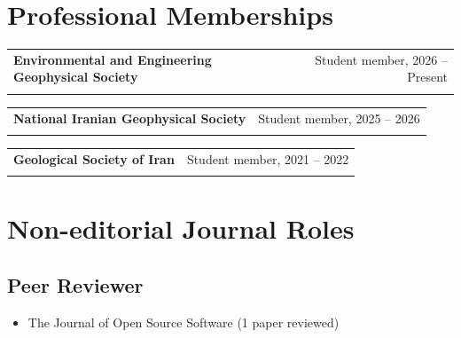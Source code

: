 \documentclass[letterpaper,10pt]{article}
\makeatletter
\newcommand{\ressubheading}[4]{%
	\begin{tabular*}{\textwidth}{l@{\cftdotfill{\cftsecdotsep}\extracolsep{\fill}}r}
		\textbf{#1} & #2 \\
		\textit{#3} & \textit{#4} \\
	\end{tabular*}\vspace{-2pt}
}
\makeatother
\begin{document}
		\vspace{-0.95em}
	
	\section{Professional Memberships}
\ressubheading{Environmental and Engineering Geophysical Society}{Student member, 2026 -- Present}{}{}

\vspace{-1.45em}

\ressubheading{National Iranian Geophysical Society}{Student member, 2025 -- 2026}{}{}

\vspace{-1.45em}

\ressubheading{Geological Society of Iran}{Student member, 2021 -- 2022}{}{}

\vspace{-1.45em}


\vspace{-0.95em}

\section{Non-editorial Journal Roles}
\begin{justify}
	\subsection*{Peer Reviewer}
	\begin{itemize}[label={},left=0pt,topsep=1pt,partopsep=0pt,itemsep=1pt,parsep=0pt]
		\item The Journal of Open Source Software (1 paper reviewed)
	\end{itemize}
\end{justify}
	
\end{document}
